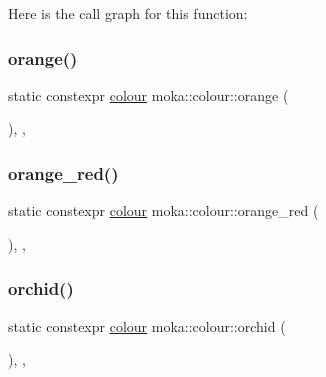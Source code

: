 Here is the call graph for this function\+:
\mbox{\label{classmoka_1_1colour_a0a1c8669c878810ccdf468d90d598882}} 
\subsubsection{\texorpdfstring{orange()}{orange()}}
{\footnotesize\ttfamily static constexpr \mbox{\hyperlink{classmoka_1_1colour}{colour}} moka\+::colour\+::orange (\begin{DoxyParamCaption}{ }\end{DoxyParamCaption})\hspace{0.3cm}{\ttfamily [inline]}, {\ttfamily [static]}, {\ttfamily [noexcept]}}

\mbox{\label{classmoka_1_1colour_abcc8eb871af80fc99257d93f8bda3fcd}} 
\subsubsection{\texorpdfstring{orange\_red()}{orange\_red()}}
{\footnotesize\ttfamily static constexpr \mbox{\hyperlink{classmoka_1_1colour}{colour}} moka\+::colour\+::orange\+\_\+red (\begin{DoxyParamCaption}{ }\end{DoxyParamCaption})\hspace{0.3cm}{\ttfamily [inline]}, {\ttfamily [static]}, {\ttfamily [noexcept]}}

\mbox{\label{classmoka_1_1colour_aad4bf4e3bb3af8b61fca846655435d00}} 
\subsubsection{\texorpdfstring{orchid()}{orchid()}}
{\footnotesize\ttfamily static constexpr \mbox{\hyperlink{classmoka_1_1colour}{colour}} moka\+::colour\+::orchid (\begin{DoxyParamCaption}{ }\end{DoxyParamCaption})\hspace{0.3cm}{\ttfamily [inline]}, {\ttfamily [static]}, {\ttfamily [noexcept]}}

